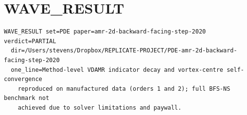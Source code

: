\documentclass[11pt,letterpaper]{article}
\begin{document}
\section*{WAVE\_RESULT}
\begin{lstlisting}
WAVE_RESULT set=PDE paper=amr-2d-backward-facing-step-2020 verdict=PARTIAL
  dir=/Users/stevens/Dropbox/REPLICATE-PROJECT/PDE-amr-2d-backward-facing-step-2020
  one_line=Method-level VDAMR indicator decay and vortex-centre self-convergence
    reproduced on manufactured data (orders 1 and 2); full BFS-NS benchmark not
    achieved due to solver limitations and paywall.
\end{lstlisting}
\end{document}
